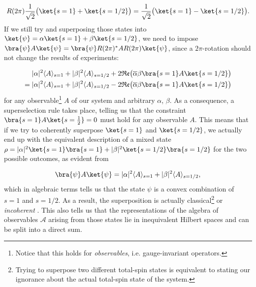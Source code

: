 \documentclass[a4paper,11pt]{article}
\begin{document}
\begin{equation}
    R(2 \pi) \frac{1}{\sqrt{2}} \big( \ket{s=1} + \ket{s=1/2} \big) = \frac{1}{\sqrt{2}} \big( \ket{s=1} - \ket{s=1/2} \big) \text{.}
\end{equation}
%
If we still try and superposing those states into $\ket{\psi} = \alpha \ket{s=1} + \beta \ket{s=1/2}$, we need to impose $\bra{\psi} A \ket{\psi} = \bra{\psi} R(2 \pi)^* A R(2 \pi) \ket{\psi}$, since a $2 \pi$-rotation should not change the results of experiments:

\begin{equation}
    \begin{split}
        |\alpha|^2 \langle A \rangle_{s=1} + |\beta|^2 \langle A \rangle_{s=1/2} + 2 \mathfrak{Re} \big( \overline{\alpha} \beta \bra{s=1} A \ket{s=1/2} \big) \\
        = |\alpha|^2 \langle A \rangle_{s=1} + |\beta|^2 \langle A \rangle_{s=1/2} - 2 \mathfrak{Re} \big( \overline{\alpha} \beta \bra{s=1} A \ket{s=1/2} \big)
    \end{split}
    \label{superselection}
\end{equation}
%
for any observable\footnote{Notice that this holds for \textit{observables}, i.e. gauge-invariant operators.} $A$ of our system and arbitrary $\alpha$, $\beta$. As a consequence, a superselection rule takes place, telling us that the constraint $\bra{s=1} A \ket{s=\frac{1}{2}} = 0$ must hold for any observable $A$. This means that if we try to coherently superpose $\ket{s=1}$ and $\ket{s=1/2}$, we actually end up with the equivalent description of a mixed state $\rho = |\alpha|^2 \ket{s=1} \bra{s=1} + |\beta|^2 \ket{s=1/2} \bra{s=1/2}$ for the two possible outcomes, as evident from

\begin{equation}
    \bra{\psi} A \ket{\psi} = |\alpha|^2 \langle A \rangle_{s=1} + |\beta|^2 \langle A \rangle_{s=1/2} \text{,}
\end{equation}
%
which in algebraic terms tells us that the state $\psi$ is a convex combination of $s=1$ and $s=1/2$. As a result, the superposition is actually classical\footnote{Trying to superpose two different total-spin states is equivalent to stating our ignorance about the actual total-spin state of the system.} or \textit{incoherent} \cite{Decoherence}. This also tells us that the representations of the algebra of observables $\mathcal{A}$ arising from those states lie in inequivalent Hilbert spaces and can be split into a direct sum.
\end{document}
